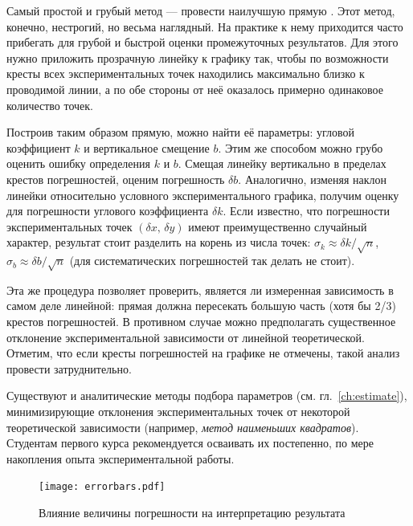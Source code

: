 Самый простой и грубый метод --- провести наилучшую прямую
. Этот метод, конечно, нестрогий,
но весьма наглядный. На практике к нему приходится часто прибегать
для грубой и быстрой оценки промежуточных результатов. Для этого нужно
приложить прозрачную линейку к графику так, чтобы по возможности кресты
всех экспериментальных точек находились максимально близко к проводимой
линии, а по обе стороны от неё оказалось примерно одинаковое количество
точек.


Построив таким образом  прямую,
можно найти её параметры: угловой коэффициент $k$ и вертикальное
смещение $b$. Этим же способом можно грубо оценить ошибку определения
$k$ и $b$. Смещая линейку вертикально в пределах крестов погрешностей,
оценим погрешность $\delta b$. Аналогично, изменяя наклон линейки
относительно условного 
экспериментального графика, получим оценку для погрешности углового
коэффициента $\delta k$. Если известно, что погрешности экспериментальных
точек $\left(\delta x,\,\delta y\right)$ имеют преимущественно случайный
характер, результат стоит разделить на корень из числа точек:
$\sigma_{k}\approx\delta k/\sqrt{n}$,
$\sigma_{b}\approx\delta b/\sqrt{n}$ (для систематических погрешностей
так делать не стоит).

Эта же процедура позволяет проверить, является ли измеренная зависимость
в самом деле линейной: прямая должна пересекать большую часть (хотя
бы 2/3) крестов погрешностей. В противном случае можно предполагать
существенное отклонение экспериментальной зависимости от линейной
теоретической. Отметим, что если кресты погрешностей на графике не
отмечены, такой анализ провести затруднительно.

Существуют и аналитические методы подбора параметров (см. гл.~\ref{ch:estimate}),
минимизирующие отклонения экспериментальных точек от некоторой теоретической зависимости
(например, \emph{метод наименьших квадратов}). Студентам первого курса
рекомендуется осваивать их постепенно, по мере накопления опыта экспериментальной
работы.

\begin{figure}
    \centering
    \texttt{[image: errorbars.pdf]}
    \caption{Влияние величины погрешности на интерпретацию результата}
    \label{fig:graph-method}
\end{figure}


